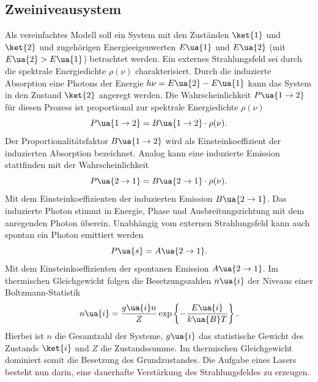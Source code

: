 \subsection{Zweiniveausystem}
Als vereinfachtes Modell soll ein System mit den Zuständen $\ket{1}$ und $\ket{2}$ und zugehörigen Energieeigenwerten
$E\ua{1}$ und $E\ua{2}$ (mit $E\ua{2}> E\ua{1}$) betrachtet werden. Ein externes Strahlungsfeld sei durch die spektrale Energiedichte $\rho(\nu)$
charakterisiert. Durch die induzierte Absorption eine Photons der Energie $h \nu = E\ua{2} - E\ua{1}$ kann das
System in den Zustand $\ket{2}$ angeregt werden. Die Wahrscheinlichkeit $P\ua{1\rightarrow 2}$ für diesen Prozess ist proportional
zur spektrale Energiedichte $\rho(\nu)$
\begin{equation}
  P\ua{1\rightarrow 2} = B\ua{1\rightarrow 2}\cdot\rho(\nu).
\end{equation}
Der Proportionalitätsfaktor $B\ua{1\rightarrow 2}$ wird als Einsteinkoeffizient der induzierten Absorption bezeichnet. Analog kann
eine induzierte Emission stattfinden mit der Wahrscheinlichkeit
\begin{equation}
  P\ua{2\rightarrow 1} = B\ua{2\rightarrow 1}\cdot\rho(\nu).
\end{equation}
Mit dem Einsteinkoeffizienten der induzierten Emission $B\ua{2\rightarrow1}$.
Das induzierte Photon stimmt in Energie, Phase und Ausbreitungsrichtung mit dem anregenden Photon überein.
Unabhängig vom externen Strahlungsfeld
kann auch spontan ein Photon emittiert werden
\begin{equation}
  P\ua{s} = A\ua{2 \rightarrow 1}.
\end{equation}
Mit dem Einsteinkoeffizienten der spontanen Emission $A\ua{2 \rightarrow 1}$. Im thermischen Gleichgewicht folgen die Besetzungszahlen
$n\ua{i}$ der Niveaus einer Boltzmann-Statistik
\begin{equation}
  n\ua{i} = \frac{g\ua{i}n}{Z}\exp\left\{-\frac{E\ua{i}}{k\ua{B}T}\right\}.
\end{equation}
Hierbei ist $n$ die Gesamtzahl der Systeme, $g\ua{i}$ das statistische Gewicht des Zustands $\ket{i}$ und $Z$ die Zustandssumme. Im thermischen
Gleichgewicht dominiert somit die Besetzung des Grundzustandes. Die Aufgabe eines Lasers besteht nun darin,
eine dauerhafte Verstärkung des Strahlungsfeldes zu erzeugen.
